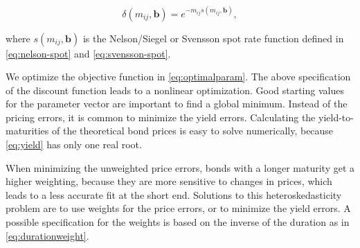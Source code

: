 \begin{displaymath}
\delta(m_{ij}, \bm{b})=e^{-m_{ij}s(m_{ij},\bm{b})},
\end{displaymath}

where $s(m_{ij},\bm{b})$ is the Nelson/Siegel or Svensson spot rate function defined in \eqref{eq:nelson-spot} and \eqref{eq:svensson-spot}.

We optimize the objective function in \eqref{eq:optimalparam}. The above specification of the discount function leads to a nonlinear optimization. Good starting values for the parameter vector are important to find a global minimum. Instead of the pricing errors, it is common to minimize the yield errors. Calculating the yield-to-maturities of the theoretical bond prices is easy to solve numerically, because \eqref{eq:yield} has only one real root. 

When minimizing the unweighted price errors, bonds with a longer maturity get a higher weighting, because they are more sensitive to changes in prices, which leads to a less accurate fit at the short end. Solutions to this heteroskedasticity problem are to use weights for the price errors, or to minimize the yield errors. A possible specification for the weights is based on the inverse of the duration as in \eqref{eq:durationweight}.


